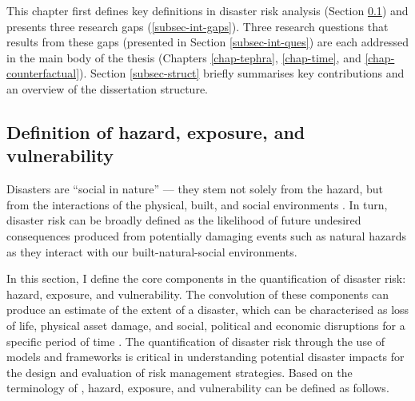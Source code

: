 This chapter first defines key definitions in disaster risk analysis (Section \ref{subsec-int-def}) and presents three research gaps (\ref{subsec-int-gaps}). Three research questions that results from these gaps (presented in Section \ref{subsec-int-ques}) are each addressed in the main body of the thesis (Chapters \ref{chap-tephra}, \ref{chap-time}, and \ref{chap-counterfactual}). Section \ref{subsec-struct} briefly summarises key contributions and an overview of the dissertation structure.


\subsection{Definition of hazard, exposure, and vulnerability} \label{subsec-int-def}

Disasters are “social in nature” — they stem not solely from the hazard, but from the interactions of the physical, built, and social environments \citep{mileti1999disasters, peek2021interdisciplinary}. In turn, disaster risk can be broadly defined as the likelihood of future undesired consequences produced from potentially damaging events such as natural hazards as they interact with our built-natural-social environments. 

In this section, I define the core components in the quantification of disaster risk: hazard, exposure, and vulnerability. The convolution of these components can produce an estimate of the extent of a disaster, which can be characterised as loss of life, physical asset damage, and social, political and economic disruptions for a specific period of time \citep{smith2005through, moore1958tornadoes}. The quantification of disaster risk through the use of models and frameworks is critical in understanding potential disaster impacts for the design and evaluation of risk management strategies. Based on the terminology of \citet{assembly2016report}, hazard, exposure, and vulnerability can be defined as follows.

